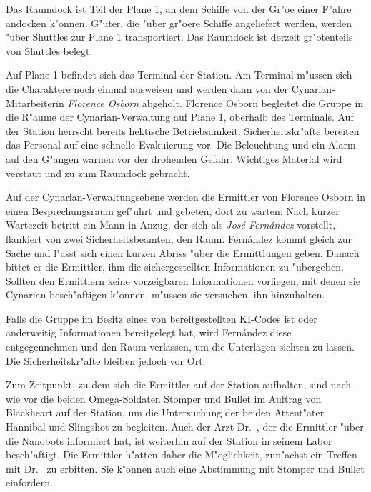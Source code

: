 Das Raumdock ist Teil der Plane 1, an dem Schiffe von der Gr"o\3e einer F"ahre andocken k"onnen. G"uter, die "uber gr"o\3ere Schiffe angeliefert werden, werden "uber Shuttles zur Plane 1 transportiert. Das Raumdock ist derzeit gr"o\3tenteils von Shuttles belegt.

Auf Plane 1 befindet sich das Terminal der Station. Am Terminal m"ussen sich die Charaktere noch einmal ausweisen und werden dann von der Cynarian-Mitarbeiterin \emph{Florence Osborn} abgeholt. Florence Osborn begleitet die Gruppe in die R"aume der Cynarian-Verwaltung auf Plane 1, oberhalb des Terminals. Auf der Station herrscht bereits hektische Betriebsamkeit. Sicherheitskr"afte bereiten das Personal auf eine schnelle Evakuierung vor. Die Beleuchtung und ein Alarm auf den G"angen warnen vor der drohenden Gefahr. Wichtiges Material wird verstaut und zu zum Raumdock gebracht.

Auf der Cynarian-Verwaltungsebene werden die Ermittler von Florence Osborn in einen Besprechungsraum gef"uhrt und gebeten, dort zu warten. Nach kurzer Wartezeit betritt ein Mann in Anzug, der sich als \emph{Jos\'e Fern\'andez} vorstellt, flankiert von zwei Sicherheitsbeamten, den Raum. Fern\'andez kommt gleich zur Sache und l"asst sich einen kurzen Abriss "uber die Ermittlungen geben. Danach bittet er die Ermittler, ihm die sichergestellten Informationen zu "ubergeben. Sollten den Ermittlern keine vorzeigbaren Informationen vorliegen, mit denen sie Cynarian besch"aftigen k"onnen, m"ussen sie versuchen, ihn hinzuhalten. 

Falls die Gruppe im Besitz eines von \ml{} bereitgestellten KI-Codes ist oder anderweitig Informationen bereitgelegt hat, wird Fern\'andez diese entgegennehmen und den Raum verlassen, um die Unterlagen sichten zu lassen. Die Sicherheitskr"afte bleiben jedoch vor Ort.

Zum Zeitpunkt, zu dem sich die Ermittler auf der Station aufhalten, sind nach wie vor die beiden Omega-Soldaten Stomper und Bullet im Auftrag von Blackheart auf der Station, um die Untersuchung der beiden Attent"ater Hannibal und Slingshot zu begleiten. Auch der Arzt  
Dr.~, der die Ermittler "uber die Nanobots informiert hat, ist weiterhin auf der Station in seinem Labor besch"aftigt. Die Ermittler h"atten daher die M"oglichkeit, zun"achst ein Treffen mit Dr.~ zu erbitten. Sie k"onnen auch eine Abstimmung mit Stomper und Bullet einfordern.

